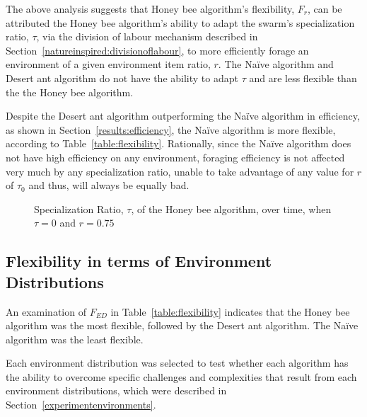 The above analysis suggests that Honey bee algorithm's flexibility, $F_r$, can be attributed the Honey bee algorithm's ability to adapt the swarm's specialization ratio, $\tau$, via the division of labour mechanism described in Section~\ref{natureinspired:divisionoflabour}, to more efficiently forage an environment of a given environment item ratio, $r$. The Na\"ive algorithm and Desert ant algorithm do not have the ability to adapt $\tau$ and are less flexible than the the Honey bee algorithm.

Despite the Desert ant algorithm outperforming the Na\"ive algorithm in efficiency, as shown in Section~\ref{results:efficiency}, the Na\"ive algorithm is more flexible, according to Table~\ref{table:flexibility}. Rationally, since the Na\"ive algorithm does not have high efficiency on any environment, foraging efficiency is not affected very much by any specialization ratio, unable to take advantage of any value for $r$ of $\tau_0$ and thus, will always be equally bad.


\begin{figure}[!htb]
\centering
\resizebox{\textwidth}{!}{}
\caption{Specialization Ratio, $\tau$, of the Honey bee algorithm, over time, when $\tau=0$ and $r=0.75$}
\label{fig:specializationratioovertime}
\end{figure}


\subsection{Flexibility in terms of Environment Distributions}
\label{results:flexibility:environmentdistribution}

An examination of $F_{ED}$ in Table~\ref{table:flexibility} indicates that the Honey bee algorithm was the most flexible, followed by the Desert ant algorithm. The Na\"ive algorithm was the least flexible.

Each environment distribution was selected to test whether each algorithm has the ability to overcome specific challenges and complexities that result from each environment distributions, which were described in Section~\ref{experimentenvironments}.


